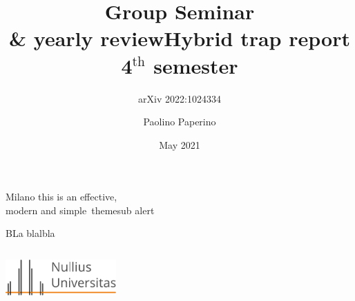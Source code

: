 \documentclass[11pt,xcolor={dvipsnames}]{beamer}
\title{Group Seminar\\ \& yearly review}
\title{Hybrid trap report \\ 4$^{\text{th}}$ semester}
\subtitle{arXiv 2022:1024334}
\subtitle{}
\author{Paolino Paperino}
\institute
{Group of {\bfseries Donald Duck}, \\ University of Paperopoli
}
\date{May 2021}
\begin{document}
\maketitle 
\begin{frame}{Milano this is an effective,\\modern and simple\ theme}{sub}
\alert{alert}
\begin{block}{BLa}
	blalbla
\end{block}
\end{frame}
 


\begin{frame}[plain, t]
\begin{columns}[onlytextwidth]

\vspace{40pt}

 \insertauthor\par \vspace{20pt}
\vfill
{}\insertinstitute \par \vspace{3pt}
 \insertdate\par \vspace{20pt}
\includegraphics[width=120pt]{./img/univ_logo}
\vfill

	\raggedleft
\vspace{40pt}

{  \inserttitle}\par
\vfill 
{  \insertsubtitle}\par
\end{columns}
\end{frame}
\end{document}
